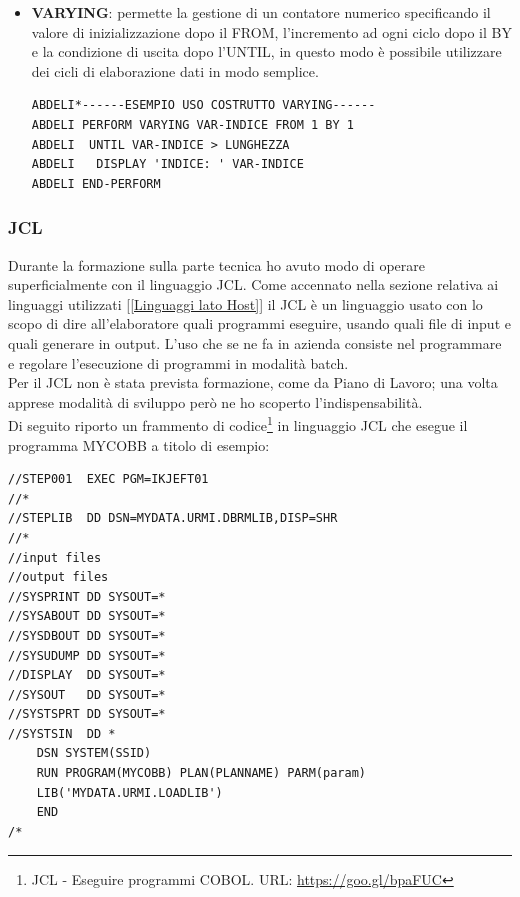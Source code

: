 \begin{itemize}
	\item \textbf{VARYING}: permette la gestione di un contatore numerico specificando il valore di inizializzazione dopo il FROM, l'incremento ad ogni ciclo dopo il BY e la condizione di uscita dopo l'UNTIL, in questo modo è possibile utilizzare dei cicli di elaborazione dati in modo semplice.
	\begin{lstlisting}[language=cobol]	
ABDELI*------ESEMPIO USO COSTRUTTO VARYING------
ABDELI PERFORM VARYING VAR-INDICE FROM 1 BY 1
ABDELI  UNTIL VAR-INDICE > LUNGHEZZA
ABDELI   DISPLAY 'INDICE: ' VAR-INDICE
ABDELI END-PERFORM
	\end{lstlisting}
		
\end{itemize}
	
\subsubsection{JCL}
Durante la formazione sulla parte tecnica ho avuto modo di operare superficialmente con il linguaggio JCL\glossario. Come accennato nella sezione relativa ai linguaggi utilizzati [\ref{Linguaggi lato Host}] il JCL è un linguaggio usato con lo scopo di dire all'elaboratore quali programmi eseguire, usando quali file di input e quali generare in output. L'uso che se ne fa in azienda consiste nel programmare e regolare l’esecuzione di programmi in modalità batch\glossario. \\

Per il JCL non è stata prevista formazione, come da Piano di Lavoro; una volta apprese modalità di sviluppo però ne ho scoperto l'indispensabilità.\\

Di seguito riporto un frammento di codice\footnote{JCL - Eseguire programmi COBOL. URL: \url{https://goo.gl/bpaFUC}} in linguaggio JCL che esegue il programma MYCOBB a titolo di esempio:

\begin{lstlisting}[language=Cobol]
//STEP001  EXEC PGM=IKJEFT01
//*
//STEPLIB  DD DSN=MYDATA.URMI.DBRMLIB,DISP=SHR
//*
//input files
//output files
//SYSPRINT DD SYSOUT=*
//SYSABOUT DD SYSOUT=*
//SYSDBOUT DD SYSOUT=*
//SYSUDUMP DD SYSOUT=*
//DISPLAY  DD SYSOUT=*
//SYSOUT   DD SYSOUT=*
//SYSTSPRT DD SYSOUT=*
//SYSTSIN  DD *
    DSN SYSTEM(SSID)
    RUN PROGRAM(MYCOBB) PLAN(PLANNAME) PARM(param)
    LIB('MYDATA.URMI.LOADLIB')
    END
/*
\end{lstlisting}


